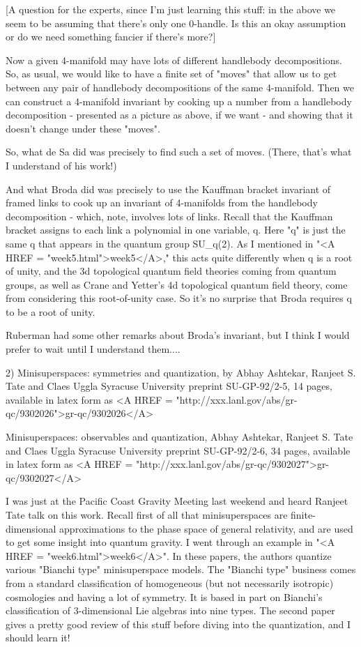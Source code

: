 [A question for the experts, since I'm just learning this stuff: in the
above we seem to be assuming that there's only one 0-handle.  Is this an
okay assumption or do we need something fancier if there's more?]

Now a given 4-manifold may have lots of different handlebody
decompositions.  So, as usual, we would like to have a finite set of
"moves" that allow us to get between any pair of handlebody
decompositions of the same 4-manifold.  Then we can construct a 4-manifold
invariant by cooking up a number from a handlebody decomposition -
presented as a picture as above, if we want - and showing that it
doesn't change under these "moves".  

So, what de Sa did was precisely to find such a set of moves. (There,
that's what I understand of his work!)

And what Broda did was precisely to use the Kauffman bracket invariant
of framed links to cook up an invariant of 4-manifolds from the
handlebody decomposition - which, note, involves lots of links.  Recall
that the Kauffman bracket assigns to each link a polynomial in one
variable, q.  Here "q" is just the same q that appears in the quantum
group SU_q(2).  As I mentioned in "<A HREF = "week5.html">week5</A>," this acts quite differently
when q is a root of unity, and the 3d topological quantum field theories
coming from quantum groups, as well as Crane and Yetter's 4d topological
quantum field theory, come from considering this root-of-unity case.  So
it's no surprise that Broda requires q to be a root of unity.

Ruberman had some other remarks about Broda's invariant, but I think I
would prefer to wait until I understand them....

2) Minisuperspaces: symmetries and quantization, by Abhay Ashtekar,
Ranjeet S. Tate and Claes Uggla Syracuse University preprint
SU-GP-92/2-5, 14 pages, available in latex form as <A HREF = "http://xxx.lanl.gov/abs/gr-qc/9302026">gr-qc/9302026</A>

Minisuperspaces: observables and quantization, Abhay Ashtekar,
Ranjeet S. Tate and Claes Uggla Syracuse University preprint 
SU-GP-92/2-6, 34 pages, available in latex form as <A HREF = "http://xxx.lanl.gov/abs/gr-qc/9302027">gr-qc/9302027</A>

I was just at the Pacific Coast Gravity Meeting last weekend and
heard Ranjeet Tate talk on this work.  Recall first of all that
minisuperspaces are finite-dimensional approximations to the phase space
of general relativity, and are used to get some insight into quantum
gravity.  I went through an example in "<A HREF = "week6.html">week6</A>".  In these papers, the
authors quantize various "Bianchi type" minisuperspace models.  The
"Bianchi type" business comes from a standard classification of
homogeneous (but not necessarily isotropic) cosmologies and having a lot
of symmetry.  It is based in part on Bianchi's classification of
3-dimensional Lie algebras into nine types.  The second paper gives a
pretty good review of this stuff before diving into the quantization,
and I should learn it!  

